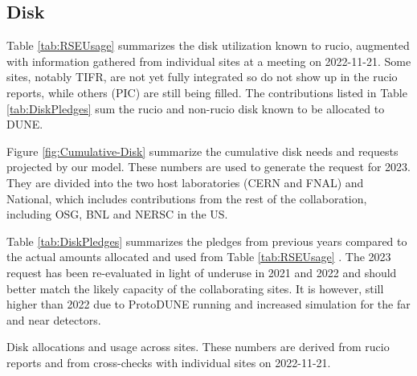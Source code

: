 \documentclass[12pt]{article}
\begin{document}
\subsection{Disk}
Table \ref{tab:RSEUsage} summarizes the disk utilization known to rucio, augmented with information gathered from individual sites at a meeting on 2022-11-21.  Some sites, notably TIFR, are not yet fully integrated so do not show up in the rucio reports, while others (PIC) are still being filled.  The contributions listed in Table \ref{tab:DiskPledges} sum the rucio and non-rucio disk known to be allocated to DUNE.

Figure \ref{fig:Cumulative-Disk}  summarize the cumulative disk needs and requests projected by our model. These numbers are used to generate the request for 2023.  They are divided into the two host laboratories (CERN and FNAL) and National, which includes contributions from the rest of the collaboration, including OSG, BNL and NERSC in the US. 

Table \ref{tab:DiskPledges} summarizes the pledges from previous years compared to the actual amounts allocated and used from Table \ref{tab:RSEUsage} .   The 2023 request has been re-evaluated in light of underuse in 2021 and 2022 and should better match the likely capacity of the collaborating sites.  It is however, still higher than 2022 due to ProtoDUNE running and increased simulation for the far and near detectors. 

\begin{table}[ht]
\centering{}
\caption{Disk allocations and usage across sites.    These numbers are derived from rucio reports and from cross-checks with individual sites on 2022-11-21. }
\label{tab:RSEUsage}
\end{table}
\end{document}
